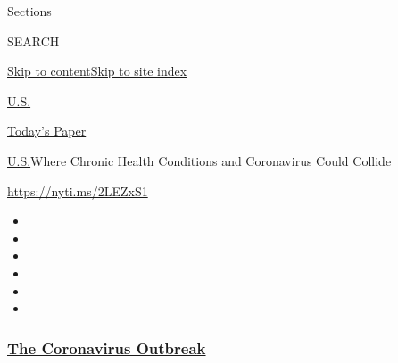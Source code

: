 Sections

SEARCH

\protect\hyperlink{site-content}{Skip to
content}\protect\hyperlink{site-index}{Skip to site index}

\href{https://www.nytimes3xbfgragh.onion/section/us}{U.S.}

\href{https://myaccount.nytimes3xbfgragh.onion/auth/login?response_type=cookie\&client_id=vi}{}

\href{https://www.nytimes3xbfgragh.onion/section/todayspaper}{Today's
Paper}

\href{/section/us}{U.S.}\textbar{}Where Chronic Health Conditions and
Coronavirus Could Collide

\url{https://nyti.ms/2LEZxS1}

\begin{itemize}
\item
\item
\item
\item
\item
\item
\end{itemize}

\hypertarget{the-coronavirus-outbreak}{%
\subsubsection{\texorpdfstring{\href{https://www.nytimes3xbfgragh.onion/news-event/coronavirus?name=styln-coronavirus-national\&region=TOP_BANNER\&block=storyline_menu_recirc\&action=click\&pgtype=Interactive\&impression_id=9ff1a4f0-f2a9-11ea-b26b-4f4bf8e5c9c3\&variant=undefined}{The
Coronavirus
Outbreak}}{The Coronavirus Outbreak}}\label{the-coronavirus-outbreak}}


